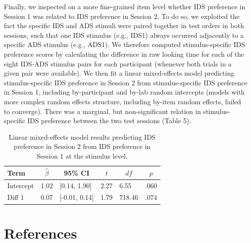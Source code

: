 \documentclass[
  man, donotrepeattitle,floatsintext]{apa6}
\begin{document}
Finally, we inspected on a more fine-grained item level whether IDS preference in Session 1 was related to IDS preference in Session 2.
To do so, we exploited the fact the specific IDS and ADS stimuli were paired together in test orders in both sessions, such that one IDS stimulus (e.g., IDS1) always occurred adjacently to a specific ADS stimulus (e.g., ADS1).
We therefore computed stimulus-specific IDS preference scores by calculating the difference in raw looking time for each of the eight IDS-ADS stimulus pairs for each participant (whenever both trials in a given pair were available).
We then fit a linear mixed-effects model predicting stimulus-specific IDS preference in Session 2 from stimulus-specific IDS preference in Session 1, including by-participant and by-lab random intercepts (models with more complex random effects structure, including by-item random effects, failed to converge).
There was a marginal, but non-significant relation in stimulus-specific IDS preference between the two test sessions (Table 5).

\begin{table}[tbp]

\begin{center}
\begin{threeparttable}

\caption{\label{tab:unnamed-chunk-42}Linear mixed-effects model results predicting IDS preference in Session 2 from IDS preference in Session 1 at the stimulus level.}

\begin{tabular}{llllll}
\toprule
Term & \multicolumn{1}{c}{$\hat{\beta}$} & \multicolumn{1}{c}{95\% CI} & \multicolumn{1}{c}{$t$} & \multicolumn{1}{c}{$\mathit{df}$} & \multicolumn{1}{c}{$p$}\\
\midrule
Intercept & 1.02 & {}[0.14, 1.90] & 2.27 & 6.55 & .060\\
Diff 1 & 0.07 & {}[-0.01, 0.14] & 1.79 & 718.46 & .074\\
\bottomrule
\end{tabular}

\end{threeparttable}
\end{center}

\end{table}

\newpage

\hypertarget{references}{%
\section{References}\label{references}}
\end{document}
